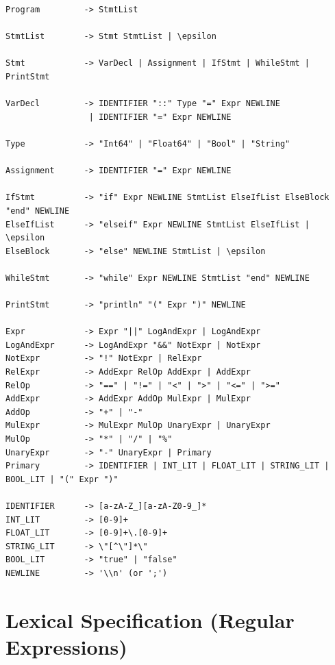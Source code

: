 \documentclass[11pt]{article}
\begin{document}
\begin{verbatim}
Program         -> StmtList

StmtList        -> Stmt StmtList | \epsilon

Stmt            -> VarDecl | Assignment | IfStmt | WhileStmt | PrintStmt

VarDecl         -> IDENTIFIER "::" Type "=" Expr NEWLINE
                 | IDENTIFIER "=" Expr NEWLINE

Type            -> "Int64" | "Float64" | "Bool" | "String"

Assignment      -> IDENTIFIER "=" Expr NEWLINE

IfStmt          -> "if" Expr NEWLINE StmtList ElseIfList ElseBlock "end" NEWLINE
ElseIfList      -> "elseif" Expr NEWLINE StmtList ElseIfList | \epsilon
ElseBlock       -> "else" NEWLINE StmtList | \epsilon

WhileStmt       -> "while" Expr NEWLINE StmtList "end" NEWLINE

PrintStmt       -> "println" "(" Expr ")" NEWLINE

Expr            -> Expr "||" LogAndExpr | LogAndExpr
LogAndExpr      -> LogAndExpr "&&" NotExpr | NotExpr
NotExpr         -> "!" NotExpr | RelExpr
RelExpr         -> AddExpr RelOp AddExpr | AddExpr
RelOp           -> "==" | "!=" | "<" | ">" | "<=" | ">="
AddExpr         -> AddExpr AddOp MulExpr | MulExpr
AddOp           -> "+" | "-"
MulExpr         -> MulExpr MulOp UnaryExpr | UnaryExpr
MulOp           -> "*" | "/" | "%"
UnaryExpr       -> "-" UnaryExpr | Primary
Primary         -> IDENTIFIER | INT_LIT | FLOAT_LIT | STRING_LIT | BOOL_LIT | "(" Expr ")"

IDENTIFIER      -> [a-zA-Z_][a-zA-Z0-9_]*
INT_LIT         -> [0-9]+
FLOAT_LIT       -> [0-9]+\.[0-9]+
STRING_LIT      -> \"[^\"]*\"
BOOL_LIT        -> "true" | "false"
NEWLINE         -> '\\n' (or ';')
\end{verbatim}

\section{Lexical Specification (Regular Expressions)}
\end{document}
